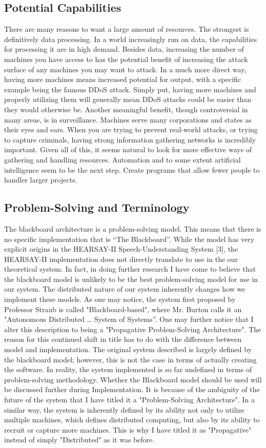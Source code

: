 \subsection{Potential Capabilities}
There are many reasons to want a large amount of resources. The strongest is definitively data processing. In a world increasingly run on data, the capabilities for processing it are in high demand. Besides data, increasing the number of machines you have access to has the potential benefit of increasing the attack surface of any machines you may want to attack. In a much more direct way, having more machines means increased potential for output, with a specific example being the famous DDoS attack. Simply put, having more machines and properly utilizing them will generally mean DDoS attacks could be easier than they would otherwise be. Another meaningful benefit, though controversial in many areas, is in surveillance. Machines serve many corporations and states as their eyes and ears. When you are trying to prevent real-world attacks, or trying to capture criminals, having strong information gathering networks is incredibly important. Given all of this, it seems natural to look for more effective ways of gathering and handling resources. Automation and to some extent artificial intelligence seem to be the next step. Create programs that allow fewer people to handler larger projects.
\subsection{Problem-Solving and Terminology}
The blackboard architecture is a problem-solving model. This means that there is no specific implementation that is “The Blackboard”. While the model has very explicit origins in the HEARSAY-II Speech-Understanding System [3], the HEARSAY-II implementation does not directly translate to use in the our theoretical system. In fact, in doing further research I have come to believe that the blackboard model is unlikely to be the best problem-solving model for use in our system. The distributed nature of our system inherently changes how we implement these models. As one may notice, the system first proposed by Professor Straub is called "Blackboard-based", where Mr. Burton calls it an "Autonomous Distributed … System of Systems”. One may further notice that I alter this description to being a "Propagative Problem-Solving Architecture". The reason for this continued shift in title has to do with the difference between model and implementation. The original system described is largely defined by the blackboard model; however, this is not the case in terms of actually creating the software. In reality, the system implemented is so far undefined in terms of problem-solving methodology. Whether the Blackboard model should be used will be discussed further during Implementation. It is because of the ambiguity of the future of the system that I have titled it a "Problem-Solving Architecture". In a similar way, the system is inherently defined by its ability not only to utilize multiple machines, which defines distributed computing, but also by its ability to recruit or capture more machines. This is why I have titled it as "Propagative" instead of simply "Distributed" as it was before.
